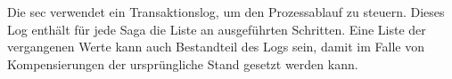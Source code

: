 Die \acrshort{sec} verwendet ein Transaktionslog, um den Prozessablauf zu steuern. Dieses Log enthält für jede Saga die Liste an ausgeführten Schritten. Eine Liste der vergangenen Werte kann auch Bestandteil des Logs sein, damit im Falle von Kompensierungen der ursprüngliche Stand gesetzt werden kann. 